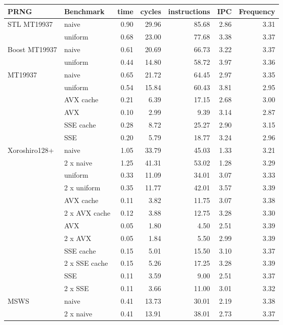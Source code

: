 \documentclass{stdlocal}
\begin{document}
\begin{tabular}{llrrrrr}
  \hline
  \textbf{PRNG} & \textbf{Benchmark} & time & cycles & instructions & IPC & Frequency\\
  \hline
  \hline
  \multirow{2}{*}{STL MT19937} & naive &  0.90 &  29.96  & 85.68 &  2.86 & 3.31 \\
  & uniform & 0.68 & 23.00 & 77.68 & 3.38 & 3.37 \\
  \hline
  \multirow{2}{*}{Boost MT19937} & naive & 0.61 & 20.69 & 66.73 & 3.22 & 3.37 \\
  & uniform & 0.44 & 14.80 & 58.72 & 3.97 & 3.36 \\
  \hline
  \multirow{6}{*}{MT19937} & naive & 0.65 & 21.72 & 64.45 & 2.97 & 3.35 \\
  & uniform & 0.54 & 15.84 & 60.43 & 3.81 & 2.95 \\
  & AVX cache & 0.21 & 6.39 & 17.15 & 2.68 & 3.00 \\
  & AVX & 0.10 & 2.99 & 9.39 & 3.14 & 2.87 \\
  & SSE cache & 0.28 & 8.72 & 25.27 & 2.90 & 3.15 \\
  & SSE & 0.20 & 5.79 & 18.77 & 3.24 & 2.96 \\
  \hline
  \multirow{12}{*}{Xoroshiro128+}
  & naive & 1.05 & 33.79 & 45.03 & 1.33 & 3.21 \\
  & 2 x naive & 1.25 & 41.31 & 53.02 & 1.28 & 3.29 \\
  & uniform & 0.33 & 11.09 & 34.01 & 3.07 & 3.33 \\
  & 2 x uniform & 0.35 & 11.77 & 42.01 & 3.57 & 3.39 \\
  & AVX cache & 0.11 &  3.82 & 11.75 & 3.07 & 3.38 \\
  & 2 x AVX cache & 0.12 &  3.88 & 12.75 & 3.28 & 3.30 \\
  & AVX & 0.05 &  1.80 &  4.50 & 2.51 & 3.39 \\
  & 2 x AVX & 0.05 &  1.84 &  5.50 & 2.99 & 3.39 \\
  & SSE cache & 0.15 &  5.01 & 15.50 & 3.10 & 3.37 \\
  & 2 x SSE cache & 0.15 &  5.26 & 17.25 & 3.28 & 3.39 \\
  & SSE & 0.11 &  3.59 &  9.00 & 2.51 & 3.37 \\
  & 2 x SSE & 0.11 &  3.66 & 11.00 & 3.01 & 3.32 \\
  \hline
  \multirow{12}{*}{MSWS}
  & naive & 0.41 & 13.73 &    30.01 & 2.19 & 3.38 \\
  & 2 x naive & 0.41 & 13.91 &    38.01 & 2.73 & 3.37 \\

\end{tabular}
\end{document}
